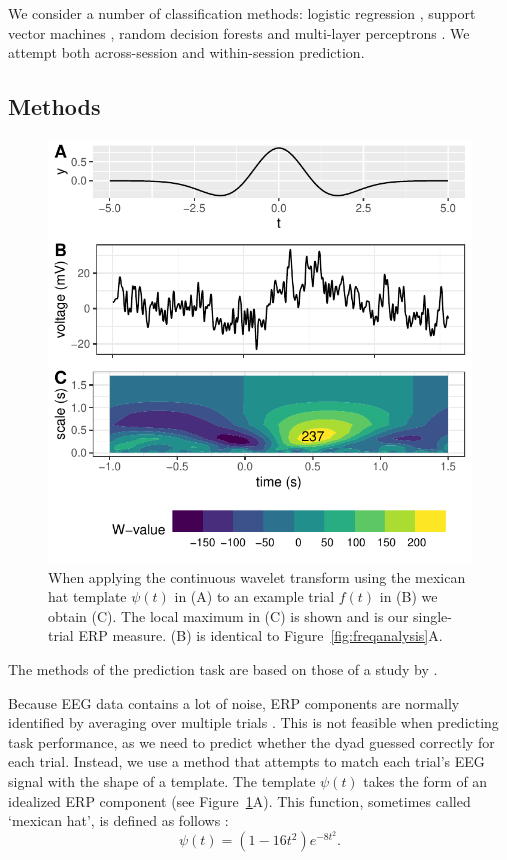 We consider a number of classification methods: logistic regression \parencite[p.137]{goodfellow_deep_2016}, support
vector machines \parencite[p.137--139]{goodfellow_deep_2016}, random decision
forests \parencite{tin_kam_ho_random_1995} and multi-layer perceptrons
\parencite{rumelhart_learning_1987}. We attempt both across-session and
within-session prediction.

\subsection{Methods}

\begin{figure}[!htpb]
  \includegraphics[width=\linewidth]{../stats/results/cwt.pdf}
  \caption{When applying the continuous wavelet transform using the mexican hat template $\psi(t)$ in (A) to an example trial $f(t)$ in (B) we obtain (C). The local maximum in (C) is shown and is our single-trial ERP measure. (B) is identical to Figure~\ref{fig:freqanalysis}A.}
  \label{fig:cwt}
\end{figure}
  
The methods of the prediction task are based on those of a study by
\textcite{jin_predicting_2019}.

Because EEG data contains a lot of noise, ERP components are normally identified
by averaging over multiple trials \parencite[p.~259]{luck_introduction_2014}.
This is not feasible when predicting task performance, as we need to predict
whether the dyad guessed correctly for each trial. Instead, we use a method that
attempts to match each trial's EEG signal with the shape of a template. The
template $\psi(t)$ takes the form of an idealized ERP component (see
Figure~\ref{fig:cwt}A). This function, sometimes called `mexican hat', is
defined as follows \parencite{bostanov_t-cwt_2006}:
\begin{equation}
\psi(t) = (1 - 16t^2)e^{-8t^2}.
\end{equation}


